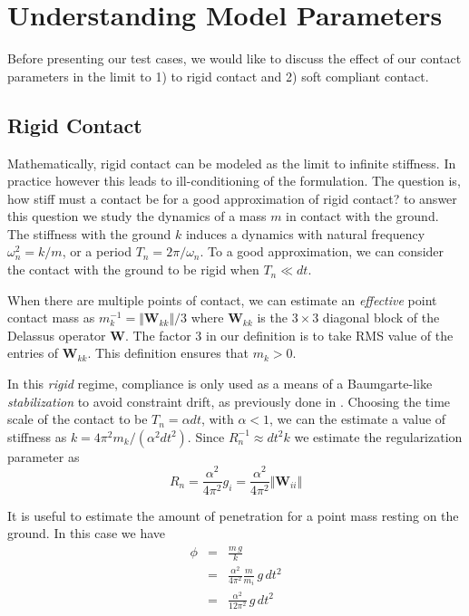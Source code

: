 \section{Understanding Model Parameters}
\label{sec:understanding_model_parameters}

Before presenting our test cases, we would like to discuss the effect of our
contact parameters in the limit to 1) to rigid contact and 2) soft compliant
contact.

\subsection{Rigid Contact}
Mathematically, rigid contact can be modeled as the limit to infinite stiffness.
In practice however this leads to ill-conditioning of the formulation. The
question is, how stiff must a contact be for a good approximation of rigid
contact? to answer this question we study the dynamics of a mass $m$ in contact
with the ground. The stiffness with the ground $k$ induces a dynamics with
natural frequency $\omega_n^2 = k/m$, or a period $T_n = 2\pi/\omega_n$. To a
good approximation, we can consider the contact with the ground to be rigid when
$T_n \ll dt$.

When there are multiple points of contact, we can estimate an \textit{effective}
point contact mass as $m_k^{-1}=\Vert\mathbf{W}_{kk}\Vert/3$ where
$\mathbf{W}_{kk}$ is the $3\times 3$ diagonal block of the Delassus operator
$\mathbf{W}$. The factor $3$ in our definition is to take RMS value
of the entries of $\mathbf{W}_{kk}$. This definition ensures that $m_k > 0$.

In this \textit{rigid} regime, compliance is only used as a means of a
Baumgarte-like \textit{stabilization} to avoid constraint drift, as previously
done in \cite{bib:todorov2011}.
 Choosing the time scale of the
contact to be $T_n = \alpha dt$, with $\alpha < 1$, we can the estimate a value
of stiffness as $k=4\pi^2 m_k/(\alpha^2 dt^2)$. Since $R_n^{-1}\approx dt^2k$ we
estimate the regularization parameter as
\begin{equation}
	R_n = \frac{\alpha^2}{4\pi^2}g_i = \frac{\alpha^2}{4\pi^2}\Vert\mathbf{W}_{ii}\Vert
\end{equation}

It is useful to estimate the amount of penetration for a point mass resting on
the ground. In this case we have
\begin{eqnarray}
	\phi &=& \frac{m\,g}{k} \nonumber\\
	&=& \frac{\alpha^2}{4\pi^2}\frac{m}{m_i}\,g\,dt^2\nonumber\\
	&=& \frac{\alpha^2}{12\pi^2}\,g\,dt^2
\end{eqnarray}

